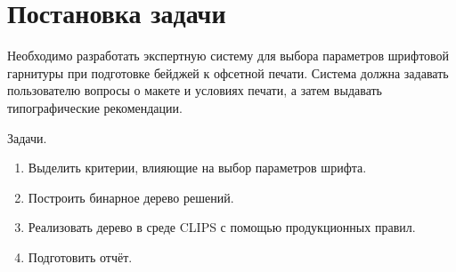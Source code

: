 \section{Постановка задачи}

Необходимо разработать экспертную систему для выбора параметров шрифтовой гарнитуры при подготовке бейджей к офсетной печати. Система должна задавать пользователю вопросы о макете и условиях печати, а затем выдавать типографические рекомендации.

Задачи.
\begin{enumerate}
    \item Выделить критерии, влияющие на выбор параметров шрифта.
    \item Построить бинарное дерево решений.
    \item Реализовать дерево в среде CLIPS с помощью продукционных правил.
    \item Подготовить отчёт.
\end{enumerate}
